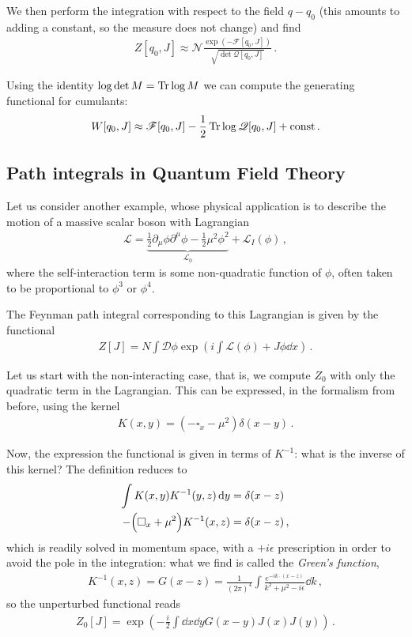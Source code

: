 \documentclass[main.tex]{subfiles}
\begin{document}
We then perform the integration with respect to the field \(q - q_0 \) (this amounts to adding a constant, so the measure does not change) and find 
%
\begin{align}
Z[q_0 , J] \approx \mathscr{N}\frac{\exp(- \mathscr{F}[q_0, J ])}{\sqrt{\det \mathscr{Q} [q_0, J]}}
\,.
\end{align}

Using the identity \(\log \det M = \Tr \log M\) we can compute the generating functional for cumulants:
%
\begin{align}
W[q_0 , J] \approx \mathscr{F}[q_0 , J] - \frac{1}{2} \Tr \log \mathscr{Q}[q_0, J] + \text{const}
\,.
\end{align}

\subsection{Path integrals in Quantum Field Theory}

Let us consider another example, whose physical application is to describe the motion of a massive scalar boson with Lagrangian 
%
\begin{align}
\mathscr{L} = \underbrace{\frac{1}{2} \partial_{\mu } \phi \partial^{\mu } \phi - \frac{1}{2} \mu^2 \phi^2}_{\mathscr{L}_{0}}+ \mathscr{L}_I (\phi )
\,,
\end{align}
%
where the self-interaction term is some non-quadratic function of \(\phi \), often taken to be proportional to  \(\phi^3\)  or \(\phi^{4}\). 

The Feynman path integral corresponding to this Lagrangian is given by the functional 
%
\begin{align}
Z[J] = N \int \mathcal{D} \phi \exp(i \int \mathscr{L}(\phi ) +  J \phi \dd{x} )
\,.
\end{align}

Let us start with the non-interacting case, that is, we compute \(Z_0 \) with only the quadratic term in the Lagrangian. This can be expressed, in the formalism from before, using the kernel 
%
\begin{align}
K(x, y )= (- \square_x - \mu^2 ) \delta (x-y)
\,.
\end{align}

Now, the expression the functional is given in terms of \(K^{-1}\): what is the inverse of this kernel? The definition reduces to 
%
\begin{align}
\int K(x, y) K^{-1}(y, z) \dd{y} &= \delta (x-z)   \\
- \qty(\square_x + \mu^2) K^{-1} (x, z) &= \delta (x-z)
\,,
\end{align}
%
which is readily solved in momentum space, with a \(+i \epsilon \) prescription in order to avoid the pole in the integration: what we find is called the \emph{Green's function}, 
%
\begin{align}
K^{-1}(x, z) = G(x-z) = \frac{1}{(2 \pi )^{4}} \int \frac{e^{-ik \cdot (x-z)}}{k^2 + \mu^2 - i \epsilon } \dd{k} 
\,,
\end{align}
%
so the unperturbed functional reads 
%
\begin{align}
Z_0 [J] = \exp(- \frac{i}{2} \int \dd{x} \dd{y} G(x-y) J(x) J(y))
\,.
\end{align}
\end{document}
